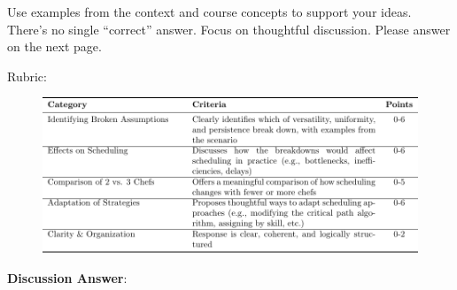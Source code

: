 \documentclass[12pt]{exam}
\begin{document}
\begin{enumerate}
Use examples from the context and course concepts to support your ideas. There's no single “correct” answer. Focus on thoughtful discussion. Please answer on the next page. \par

Rubric: 

\begin{figure}[h]
    \centering
    \includegraphics[width=1\textwidth]{RubricDiscussion.pdf}
\end{figure}

\end{enumerate}
\newpage
\textbf{Discussion Answer}:
\end{document}
